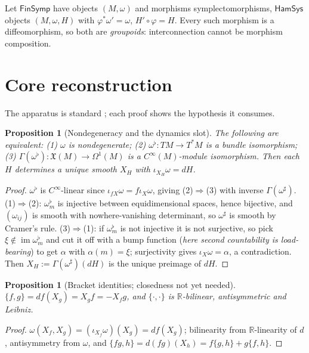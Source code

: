 \documentclass[12pt,a4paper]{article}
\theoremstyle{definition}
\theoremstyle{plain}
\newtheorem{proposition}[definition]{Proposition}
\theoremstyle{commentary}
\newcommand{\R}{\mathbb{R}}
\newcommand{\Cinf}{C^{\infty}}
\newcommand{\FinSymp}{\mathsf{FinSymp}}
\newcommand{\HamSys}{\mathsf{HamSys}}
\newcommand{\X}{\mathfrak{X}}
\newcommand{\sh}{\sharp}
\newcommand{\fl}{\flat}
\newcommand{\pb}[2]{\{#1,#2\}}
\DeclareMathOperator{\imop}{im}
\begin{document}
Let $\FinSymp$ have objects $(M,\omega)$ and morphisms symplectomorphisms, $\HamSys$ objects
$(M,\omega,H)$ with $\varphi^*\omega'=\omega$, $H'\circ\varphi=H$. Every such morphism is a
diffeomorphism, so both are \emph{groupoids}: interconnection cannot be morphism composition.

\section{Core reconstruction}
\label{sec:core}

The apparatus is standard \cite{AbrahamMarsden1978,Arnold1989}; each proof shows
the hypothesis it consumes.

\begin{proposition}[Nondegeneracy and the dynamics slot]\label{prop:nondeg}
The following are equivalent: (1) $\omega$ is nondegenerate; (2) $\omega^\fl:TM\to T^*M$ is a bundle
isomorphism; (3) $\Gamma(\omega^\fl):\X(M)\to\Omega^1(M)$ is a $\Cinf(M)$-module isomorphism. Then
each $H$ determines a unique smooth $X_H$ with $\iota_{X_H}\omega=dH$.
\end{proposition}
\begin{proof}
$\omega^\fl$ is $\Cinf$-linear since $\iota_{fX}\omega=f\iota_X\omega$, giving (2)$\Rightarrow$(3)
with inverse $\Gamma(\omega^\sh)$. (1)$\Rightarrow$(2): $\omega^\fl_m$ is injective between
equidimensional spaces, hence bijective, and $(\omega_{ij})$ is smooth with nowhere-vanishing
determinant, so $\omega^\sh$ is smooth by Cramer's rule. (3)$\Rightarrow$(1): if $\omega^\fl_m$ is
not injective it is not surjective, so pick $\xi\notin\imop\omega^\fl_m$ and cut it off with a bump
function (\emph{here second countability is load-bearing}) to get $\alpha$ with $\alpha(m)=\xi$;
surjectivity gives $\iota_X\omega=\alpha$, a contradiction. Then $X_H:=\Gamma(\omega^\sh)(dH)$ is the
unique preimage of $dH$.
\end{proof}

\begin{proposition}[Bracket identities; closedness not yet needed]\label{prop:bracket}
$\pb{f}{g}=df(X_g)=X_gf=-X_fg$, and $\pb{\cdot}{\cdot}$ is $\R$-bilinear, antisymmetric and Leibniz.
\end{proposition}
\begin{proof}
$\omega(X_f,X_g)=(\iota_{X_f}\omega)(X_g)=df(X_g)$; bilinearity from $\R$-linearity of $d$,
antisymmetry from $\omega$, and $\pb{fg}{h}=d(fg)(X_h)=f\pb{g}{h}+g\pb{f}{h}$.
\end{proof}
\end{document}

